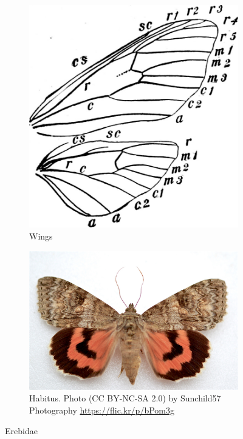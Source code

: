 \documentclass[letterpaper, 11pt]{article}
\begin{document}
\begin{figure}[ht!]
    \centering
    \begin{subfigure}[ht!]{0.36\textwidth}
        \includegraphics[width=\textwidth]{ErebidWings}
        \caption{Wings \citep[][Fig. 450]{bhl83152}}
        \label{fig:erebid1}
    \end{subfigure}
    \qquad
    \begin{subfigure}[ht!]{0.46\textwidth}
        \includegraphics[width=\textwidth]{ErebidHabitus}
        \caption{Habitus. Photo (CC BY-NC-SA 2.0) by Sunchild57 Photography \url{https://flic.kr/p/bPom3g}}
        \label{fig:erebid2}
    \end{subfigure}
    \caption{Erebidae}\label{fig:erebids}
\end{figure}
\end{document}
